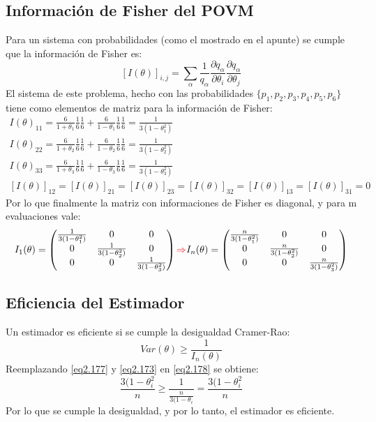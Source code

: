 \documentclass{book}
\begin{document}
\subsection{Información de Fisher del POVM}
Para un sistema con probabilidades (como el mostrado en el apunte) se cumple que la información de Fisher es:
\begin{equation}\label{eq2.175}[I(\theta)]_{i,j}=\sum_\alpha\frac{1}{q_\alpha}\frac{\partial q_\alpha}{\partial \theta_i}\frac{\partial q_\alpha}{\partial \theta_j}\end{equation}
El sistema de este problema, hecho con las probabilidades $\{p_1,p_2,p_3,p_4,p_5,p_6\}$ tiene como elementos de matriz para la información de Fisher:
\begin{equation}\label{eq2.176}\begin{aligned} 
I(\theta)_{11}=\frac{6}{1+\theta_1}\frac{1}{6}\frac{1}{6}+\frac{6}{1-\theta_1}\frac{1}{6}\frac{1}{6}=\frac{1}{3(1-\theta_1^2)} \\ I(\theta)_{22}=\frac{6}{1+\theta_2}\frac{1}{6}\frac{1}{6}+\frac{6}{1-\theta_2}\frac{1}{6}\frac{1}{6}=\frac{1}{3(1-\theta_2^2)} \\ I(\theta)_{33}=\frac{6}{1+\theta_3}\frac{1}{6}\frac{1}{6}+\frac{6}{1-\theta_3}\frac{1}{6}\frac{1}{6}=\frac{1}{3(1-\theta_3^2)}\\ [I(\theta)]_{12}=[I(\theta)]_{21}=[I(\theta)]_{23}=[I(\theta)]_{32}=[I(\theta)]_{13}=[I(\theta)]_{31}=0 \end{aligned}\end{equation}
Por lo que finalmente la matriz con informaciones de Fisher es diagonal, y para m evaluaciones vale:
\begin{equation}\label{eq2.177}I_1(\theta)=\begin{pmatrix}\frac{1}{3(1-\theta_1^2)}&0&0\\0&\frac{1}{3(1-\theta_2^2)}&0\\0&0&\frac{1}{3(1-\theta_3^2)}\end{pmatrix}\textcolor{red}{\Rightarrow} I_n(\theta)=\begin{pmatrix}\frac{n}{3(1-\theta_1^2)}&0&0\\0&\frac{n}{3(1-\theta_2^2)}&0\\0&0&\frac{n}{3(1-\theta_3^2)}\end{pmatrix} \end{equation}
\subsection{Eficiencia del Estimador}
Un estimador es eficiente si se cumple la desigualdad Cramer-Rao:
\begin{equation} \label{eq2.178}Var(\theta)\geq\frac{1}{I_n(\theta)}\end{equation}
Reemplazando \ref{eq2.177} y \ref{eq2.173} en \ref{eq2.178} se obtiene:
\begin{equation}\label{eq2.179}\frac{3(1-\theta_i^2}{n}\geq\frac{1}{\frac{n}{3(1-\theta_i}}=\frac{3(1-\theta_i^2}{n}\end{equation}
Por lo que se cumple la desigualdad, y por lo tanto, el estimador es eficiente.
\end{document}
